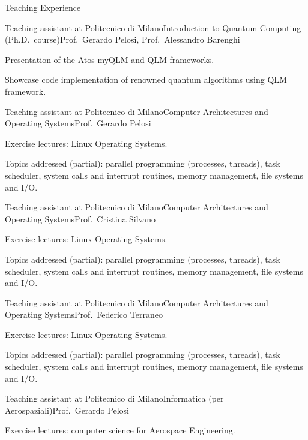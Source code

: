 \documentclass[
	a4paper, %
	11pt, %
]{tresume} %
\begin{document}
\begin{tSection}{Teaching Experience}
  \begin{tSubsection}{Teaching assistant at Politecnico di Milano}{}{Introduction
    to Quantum Computing (Ph.D.\ course)}{Prof.\ Gerardo Pelosi, Prof.\ Alessandro Barenghi}
  \item Presentation of the Atos myQLM and QLM frameworks.
  \item Showcase code implementation of renowned quantum algorithms using QLM
    framework.
  \end{tSubsection}
  \begin{tSubsection}{Teaching assistant at Politecnico di Milano}{}{Computer Architectures and Operating Systems}{Prof.\ Gerardo Pelosi}
  \item Exercise lectures: Linux Operating Systems.
  \item Topics addressed (partial): parallel programming (processes, threads),
    task scheduler, system calls and interrupt routines, memory management, file
    systems and I/O.
  \end{tSubsection}
  \begin{tSubsection}{Teaching assistant at Politecnico di Milano}{}{Computer Architectures and
      Operating Systems}{Prof.\ Cristina Silvano }
  \item Exercise lectures: Linux Operating Systems.
  \item Topics addressed (partial): parallel programming (processes, threads),
    task scheduler, system calls and interrupt routines, memory management, file
    systems and I/O.
  \end{tSubsection}
  \begin{tSubsection}{Teaching assistant at Politecnico di Milano}{}{Computer Architectures and
      Operating Systems}{Prof.\ Federico Terraneo }
  \item Exercise lectures: Linux Operating Systems.
  \item Topics addressed (partial): parallel programming (processes, threads),
    task scheduler, system calls and interrupt routines, memory management, file
    systems and I/O.
  \end{tSubsection}
  \begin{tSubsection}{Teaching assistant at Politecnico di Milano}{}{Informatica (per Aerospaziali)}{Prof.\ Gerardo Pelosi}
  \item Exercise lectures: computer science for Aerospace Engineering.

\end{tSubsection}
\end{tSection}
\end{document}
